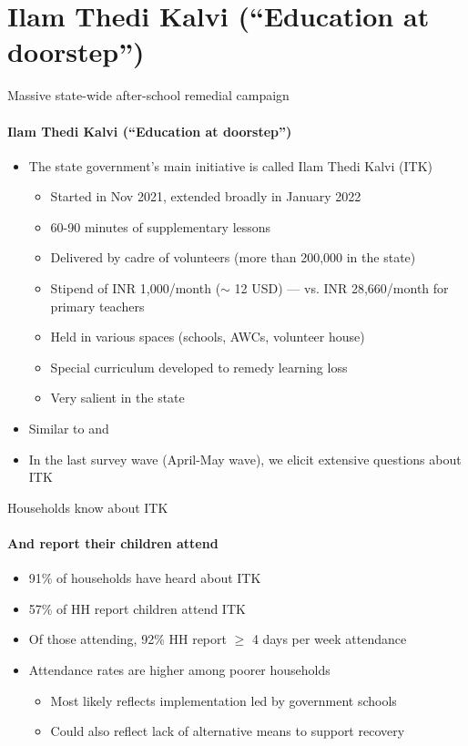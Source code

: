 \documentclass[aspectratio=169,numbering=none]{beamer}
\begin{document}
\section{Ilam Thedi Kalvi (``Education at doorstep'')}




\begin{frame}[plain]{Massive state-wide after-school remedial campaign}
\framesubtitle{Ilam Thedi Kalvi (``Education at doorstep'')}
\begin{itemize}
\vfill \item The state government's main initiative is called Ilam Thedi Kalvi (ITK)
\begin{itemize}
   \vfill  \item Started in Nov 2021, extended broadly in January 2022
    \vfill \item 60-90 minutes of supplementary lessons 
   \vfill  \item Delivered by cadre of volunteers (more than 200,000 in the state)
    \vfill  \item Stipend of INR 1,000/month ($\sim$ 12 USD) ---  vs. INR 28,660/month for primary teachers
    \vfill \item Held in various spaces (schools, AWCs, volunteer house)
    \vfill \item Special curriculum developed to remedy learning loss
   \vfill  \item Very salient in the state
\end{itemize}
\pause
\vfill \item Similar to  and 
\vfill\item In the last survey wave (April-May wave), we elicit extensive questions about ITK
\end{itemize}
\end{frame}


\begin{frame}[plain]{Households know about ITK}
\framesubtitle{And report their children attend}
\begin{itemize}
    \vfill \item 91\% of households have heard about ITK
    \vfill \item 57\% of HH report children attend ITK
    \vfill \item Of those attending, 92\% HH report	$\geq$ 4 days per week attendance
    \vfill \item Attendance rates are higher among poorer households
\begin{itemize}
    \vfill \item Most likely reflects implementation led by government schools
    \vfill \item Could also reflect lack of alternative means to support recovery
\end{itemize}
\end{itemize}
\end{frame}
\end{document}
